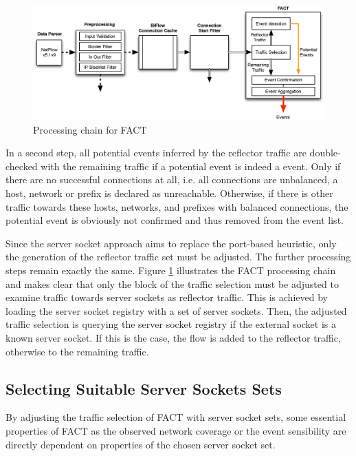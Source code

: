 \begin{figure}
	[!b] \centering
	\includegraphics[width=\linewidth]{images/FACT.eps}
	\caption{Processing chain for FACT} 
	\label{fig:fact_chain} 
\end{figure}

In a second step, all potential events inferred by the reflector traffic are 
double-checked with the remaining traffic if a potential event is indeed a 
event. Only if there are no successful connections at all, i.e. all connections 
are unbalanced, a host, network or prefix is declared as unreachable. Otherwise, 
if there is other traffic towards these hosts, networks, and prefixes with 
balanced connections, the potential event is obviously not confirmed and thus 
removed from the event list. 

Since the \gls{server socket} approach aims to replace the port-based heuristic, 
only the generation of the reflector traffic set must be adjusted. The further 
processing steps remain exactly the same. Figure \ref{fig:fact_chain} 
illustrates the \gls{FACT} processing chain and makes clear that only the block 
of the traffic selection must be adjusted to examine traffic towards 
\glspl{server socket} as reflector traffic. This is achieved by loading the 
\gls{server socket} registry with a set of \glspl{server socket}. Then, the 
adjusted traffic selection is querying the server socket registry if the 
external socket is a known \gls{server socket}. If this is the case, the flow is 
added to the reflector traffic, otherwise to the remaining traffic. 

\subsection{Selecting Suitable Server Sockets Sets\label{section:ses_selection}}
By adjusting the traffic selection of \gls{FACT} with \gls{server socket} sets, 
some essential properties of \gls{FACT} as the observed network coverage or the 
event sensibility are directly dependent on properties of the chosen 
\gls{server socket} set. 

